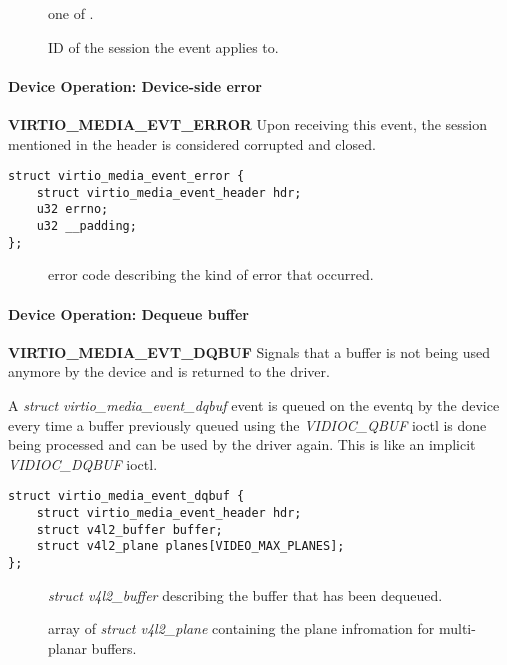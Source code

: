 \begin{description}
\item[] one of .
\item[] ID of the session the event applies to.
\end{description}

\paragraph{Device Operation: Device-side error}

\textbf{VIRTIO_MEDIA_EVT_ERROR} Upon receiving this event, the session
mentioned in the header is considered corrupted and closed.

\begin{lstlisting}
struct virtio_media_event_error {
    struct virtio_media_event_header hdr;
    u32 errno;
    u32 __padding;
};
\end{lstlisting}

\begin{description}
\item[] error code describing the kind of error that occurred.
\end{description}

\paragraph{Device Operation: Dequeue buffer}
\label{sec:Device Types / Media Device / Device Operation / Dequeue buffer}

\textbf{VIRTIO_MEDIA_EVT_DQBUF} Signals that a buffer is not being used anymore
by the device and is returned to the driver.

A \textit{struct virtio_media_event_dqbuf} event is queued on the eventq by the
device every time a buffer previously queued using the \textit{VIDIOC_QBUF}
ioctl is done being processed and can be used by the driver again. This is like
an implicit \textit{VIDIOC_DQBUF} ioctl.

\begin{lstlisting}
struct virtio_media_event_dqbuf {
    struct virtio_media_event_header hdr;
    struct v4l2_buffer buffer;
    struct v4l2_plane planes[VIDEO_MAX_PLANES];
};
\end{lstlisting}

\begin{description}
\item[] \textit{struct v4l2_buffer} describing the buffer that has been dequeued.
\item[] array of \textit{struct v4l2_plane} containing the plane infromation for multi-planar buffers.
\end{description}

